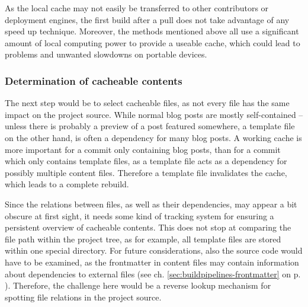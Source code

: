 As the local cache may not easily be transferred to other contributors or deployment engines, the first build after a pull does not take advantage of any speed up technique. Moreover, the methods mentioned above all use a significant amount of local computing power to provide a useable cache, which could lead to problems and unwanted slowdowns on portable devices.

\subsubsection{Determination of cacheable contents}
\label{sec:challenges-cachedetermination}
The next step would be to select cacheable files, as not every file has the same impact on the project source. While normal blog posts are mostly self-contained --  unless there is probably a preview of a post featured somewhere, a template file on the other hand, is often a dependency for many blog posts. A working cache is more important for a commit only containing blog posts, than for a commit which only contains template files, as a template file acts as a dependency for possibly multiple content files. Therefore a template file invalidates the cache, which leads to a complete rebuild.

Since the relations between files, as well as their dependencies, may appear a bit obscure at first sight, it needs some kind of tracking system for ensuring a persistent overview of cacheable contents. This does not stop at comparing the file path within the project tree, as for example, all template files are stored within one special directory. For future considerations, also the source code would have to be examined, as the frontmatter in content files may contain information about dependencies to external files (see ch. \ref{sec:buildpipelines-frontmatter} on p. \pageref{sec:buildpipelines-frontmatter}). Therefore, the challenge here would be a reverse lookup mechanism for spotting file relations in the project source.
